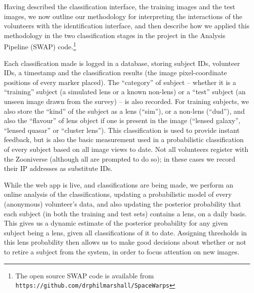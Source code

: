 \documentclass[useAMS,usenatbib,a4paper]{mn2e}
\begin{document}
Having described the classification interface, the training images and the
test images,  we now outline our methodology for interpreting the interactions
of the volunteers with the identification interface, and then describe how we
applied this methodology in the two classification stages in the \cfhtls
project in the \SW Analysis Pipeline (SWAP) code.\footnote{The open source
SWAP code is available from
\texttt{https://github.com/drphilmarshall/SpaceWarps}}

Each classification made is logged in a database, storing subject IDs,
volunteer IDs, a timestamp and the classification results (the image
pixel-coordinate positions of every marker placed).  The ``category'' of subject --
whether it is a ``training'' subject (a simulated lens or a known non-lens) or a
``test'' subject (an unseen image drawn from the survey) -- is also recorded.
For training subjects, we also store the ``kind'' of the subject as
a lens (``sim''), or a non-lens (``dud''), and also the ``flavour'' of lens
object if one is present in the image (``lensed galaxy'', ``lensed quasar'' or
``cluster lens'').  This classification is used to provide instant feedback, but
is also the basic measurement used in a probabilistic classification of every
subject based on all image views to date. Not all
volunteers register with the Zooniverse (although all are prompted to do so);
in these cases we record their IP addresses as substitute IDs.

While the \SW web app is live, and classifications are being made, we perform an
online analysis of the classifications,  updating a probabilistic model of every
(anonymous) volunteer's data, and also updating the posterior probability that
each subject (in both the training and test sets) contains a lens, on a daily
basis. This gives us a dynamic estimate of the posterior probability for  any
given  subject being a lens, given all classifications of it to date. Assigning
thresholds in this lens probability then allows us to make good decisions about
whether or not to retire a subject from the system, in order to focus attention
on new images.
\end{document}
